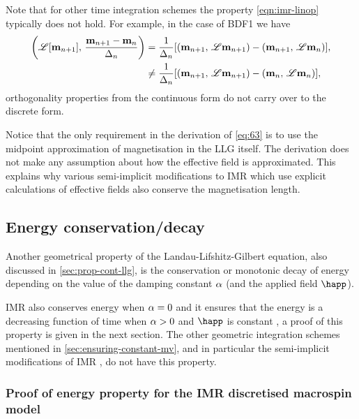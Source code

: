 Note that for other time integration schemes the property \cref{eqn:imr-linop} typically does not hold.
For example, in the case of BDF1 we have
\begin{equation}
  \begin{aligned}
    \left(\mathscr{L} {\left[ \boldsymbol{\mathrm{m}}_{n+1} \right]},\,  \frac{\boldsymbol{\mathrm{m}}_{n+1} - \boldsymbol{\mathrm{m}}_n}{\Delta_{n}}  \right)
    &= \frac{1}{\Delta_{n}} {\left[  \left(\boldsymbol{\mathrm{m}}_{n+1},\, \mathscr{L} \boldsymbol{\mathrm{m}}_{n+1} \right)
      - \left(\boldsymbol{\mathrm{m}}_{n+1},\, \mathscr{L} \boldsymbol{\mathrm{m}}_n \right)  \right]}, \\
    &\neq \frac{1}{\Delta_{n}} {\left[  \left(\boldsymbol{\mathrm{m}}_{n+1},\, \mathscr{L} \boldsymbol{\mathrm{m}}_{n+1} \right)
      - \left(\boldsymbol{\mathrm{m}}_n,\, \mathscr{L} \boldsymbol{\mathrm{m}}_n \right)  \right]},
  \end{aligned}
\end{equation}
\ie orthogonality properties from the continuous form do not carry over to the discrete form.

Notice that the only requirement in the derivation of \cref{eq:63} is to use the midpoint approximation of magnetisation in the LLG itself.
The derivation does not make any assumption about how the effective field is approximated.
This explains why various semi-implicit modifications to IMR \cite{Spargo2003,Serpico2001,Mentink2010} which use explicit calculations of effective fields also conserve the magnetisation length.


\subsection{Energy conservation/decay}
\label{sec:energy-cons}

Another geometrical property of the Landau-Lifshitz-Gilbert equation, also discussed in \cref{sec:prop-cont-llg}, is the conservation or monotonic decay of energy depending on the value of the damping constant $\alpha$ (and the applied field $\happ$).

IMR also conserves energy when $\alpha = 0$ and it ensures that the energy is a decreasing function of time when $\alpha > 0$ and $\happ$ is constant \cite{DAquino2005}, a proof of this property is given in the next section.
The other geometric integration schemes mentioned in \cref{sec:ensuring-constant-mv}, and in particular the semi-implicit modifications of IMR \cite{Spargo2003,Serpico2001,Mentink2010}, do not have this property.


\subsubsection{Proof of energy property for the IMR discretised macrospin model}
\label{sec:proof-energy-prop}

